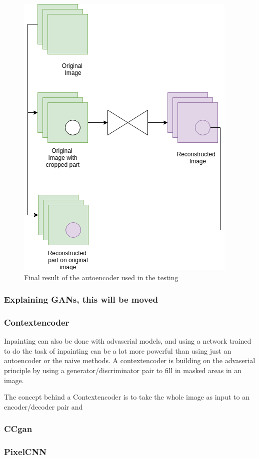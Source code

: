 	
	\begin{figure}[ht!]
	    \centering
	    \includegraphics[scale=0.5]{background/figures/AE_for_inpainting.png}
	    \caption{Final result of the autoencoder used in the testing}
	\end{figure}
	
	
	
	
	
      \subsubsection{Explaining GANs, this will be moved}
      
	
      \subsubsection{Contextencoder}
	Inpainting can also be done with advaserial models, and using a network trained to do the task of inpainting can be a lot more powerful than using just an autoencoder or the naive methods.
	A contextencoder is building on the advaserial principle by using a generator/discriminator pair to fill in masked areas in an image. 
	
	The concept behind a Contextencoder is to take the whole image as input to an encoder/decoder pair and 
	
	
	
      \subsubsection{CCgan}
      \subsubsection{PixelCNN}
      
  
 
